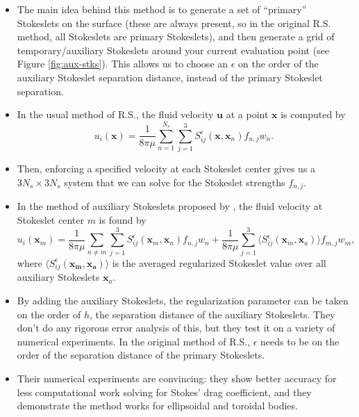 \documentclass{article}
\newcommand{\vect}[1]{\boldsymbol{\mathbf{#1}}}
\begin{document}
\begin{itemize}
\item The main idea behind this method is to generate a set of
  ``primary'' Stokeslets on the surface (these are always present, so
  in the original R.S. method, all Stokeslets are primary Stokeslets),
  and then generate a grid of temporary/auxiliary Stokeslets around
  your current evaluation point (see Figure \ref{fig:aux-stks}). This
  allows us to choose an $\epsilon$ on the order of the auxiliary
  Stokeslet separation distance, instead of the primary Stokeslet
  separation. 
\item In the usual method of R.S., the fluid velocity $\vect{u}$ at a
  point $\vect{x}$ is computed by
  \begin{equation}
    u_i(\vect{x}) = \frac{1}{8\pi\mu} \sum_{n=1}^{N_s} \sum_{j=1}^3
    S_{ij}^\epsilon (\vect{x}, \vect{x}_n) f_{n, j}
    w_n. \label{eq:org-mrs} 
  \end{equation}
\item Then, enforcing a specified velocity at each Stokeslet center
  gives us a $3N_s \times 3N_s$ system that we can solve for the
  Stokeslet strengths $f_{n, j}$.
\item In the method of auxiliary Stokeslets proposed by
  \cite{Barrero-Gil2013}, the fluid velocity at Stokeslet center $m$
  is found by
  \begin{equation}
    \label{eq:eq:mod-mrs}
    u_i(\vect{x}_m) = \frac{1}{8\pi\mu} \sum_{n \neq m} \sum_{j=1}^3
    S_{ij}^\epsilon (\vect{x}_m, \vect{x}_n) f_{n, j} w_n +
    \frac{1}{8\pi\mu} \sum_{j=1}^3 \langle S_{ij}^\epsilon
    (\vect{x}_m, \vect{x}_a) \rangle f_{m, j} w_m,
  \end{equation}
  where $\langle S_{ij}^\epsilon (\vect{x_m}, \vect{x_a}) \rangle$ is
  the averaged regularized Stokeslet value over all auxiliary
  Stokeslets $\vect{x}_a$.
\item By adding the auxiliary Stokeslets, the regularization parameter
  can be taken on the order of $h$, the separation distance of the
  auxiliary Stokeslets. They don't do any rigorous error analysis of
  this, but they test it on a variety of numerical experiments. In the
  original method of R.S., $\epsilon$ needs to be on the order of the
  separation distance of the primary Stokeslets.
\item Their numerical experiments are convincing: they show better
  accuracy for less computational work solving for Stokes' drag
  coefficient, and they demonstrate the method works for ellipsoidal
  and toroidal bodies.

\end{itemize}
\end{document}
